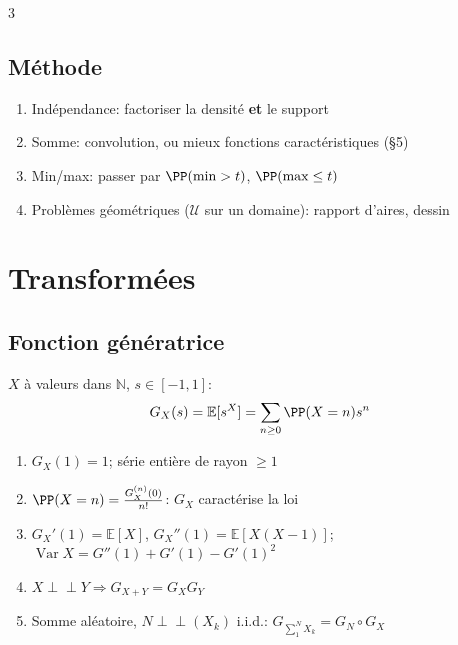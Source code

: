 \documentclass[12pt, a4paper]{article}
\newcommand{\E}{\mathbb{E}}
\newcommand{\N}{\mathbb{N}}
\newcommand{\Var}{\operatorname{Var}}
\begin{document}
\begin{multicols*}{3}
	\subsection{Méthode}
	\begin{enumerate}[\roman*.]
		\item Indépendance: factoriser la densité \textbf{et} le support
		\item Somme: convolution, ou mieux fonctions caractéristiques (§5)
		\item Min/max: passer par $\PP(\min>t)$, $\PP(\max\leq t)$
		\item Problèmes géométriques ($\mathcal U$ sur un domaine): rapport d'aires, dessin
	\end{enumerate}

	\colbreak
	\section{Transformées}
	\subsection{Fonction génératrice}
	$X$ à valeurs dans $\N$, $s\in[-1,1]$:
	\begin{gather*}
		G_X(s)=\E[s^X]=\sum_{n\geq0}\PP(X=n)s^n
	\end{gather*}
	\begin{enumerate}[\roman*.]
		\item $G_X(1)=1$; série entière de rayon $\geq1$
		\item $\PP(X=n)=\frac{G_X^{(n)}(0)}{n!}$: $G_X$ caractérise la loi
		\item $G_X'(1)=\E[X]$, $G_X''(1)=\E[X(X-1)]$; $\Var X=G''(1)+G'(1)-G'(1)^2$
		\item $X\perp\!\!\!\perp Y\Rightarrow G_{X+Y}=G_XG_Y$
		\item Somme aléatoire, $N\perp\!\!\!\perp(X_k)$ i.i.d.: $G_{\sum_1^NX_k}=G_N\circ G_X$
	\end{enumerate}


\end{multicols*}
\end{document}
